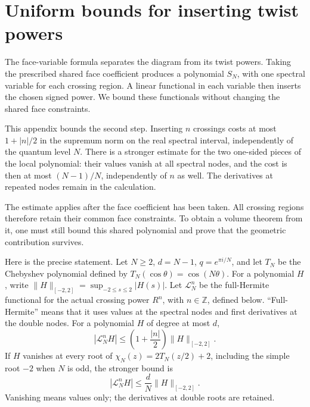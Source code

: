 \chapter{Uniform bounds for inserting twist powers}
\label{app:uniform-filling-bound}

The face-variable formula separates the diagram from its twist
powers. Taking the prescribed shared face coefficient produces a
polynomial \(S_N\), with one spectral variable for each crossing
region. A linear functional in each variable then inserts the
chosen signed power. We bound these functionals without changing
the shared face constraints.

This appendix bounds the second step. Inserting \(n\) crossings costs at
most \(1+|n|/2\) in the supremum norm on the real spectral interval,
independently of the quantum level \(N\). There is a stronger estimate
for the two one-sided pieces of the local polynomial: their values
vanish at all spectral nodes, and the cost is then at most \((N-1)/N\),
independently of \(n\) as well. The derivatives at repeated nodes remain
in the calculation.

The estimate applies after the face coefficient has been taken. All
crossing regions therefore retain their common face constraints. To
obtain a volume theorem from it, one must still bound this shared
polynomial and prove that the geometric contribution survives.

Here is the precise statement. Let $N\ge2$, $d=N-1$,
$q=e^{\pi i/N}$, and let $T_N$ be the Chebyshev polynomial defined by
$T_N(\cos\theta)=\cos(N\theta)$. For a polynomial $H$, write
$\|H\|_{[-2,2]}=\sup_{-2\le s\le2}|H(s)|$. Let \(\mathcal L_N^{n}\) be the full-Hermite
functional for the actual crossing power \(R^n\), with
\(n\in\mathbb Z\), defined below. ``Full-Hermite'' means that it
uses values at the spectral nodes and first derivatives at the double
nodes. For a polynomial \(H\) of degree at
most \(d\), \begin{equation}\label{uf:eq-1}
|\mathcal L_N^{n}H|
       \le \left(1+\frac{|n|}{2}\right)
                         \|H\|_{[-2,2]}.
\end{equation} If \(H\) vanishes at every root of \(\chi_N(z)=2T_N(z/2)+2\),
including the simple root \(-2\) when \(N\) is odd, the stronger bound
is \begin{equation}\label{uf:eq-2}
|\mathcal L_N^{n}H|\le \frac dN\|H\|_{[-2,2]}.
\end{equation} Vanishing means values only; the derivatives at double roots are
retained.

